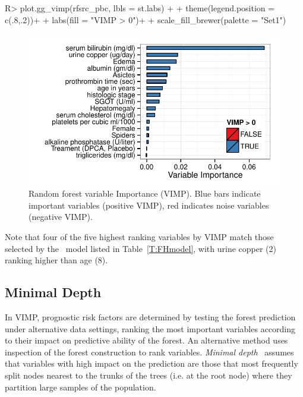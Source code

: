 \documentclass[nojss]{jss}\usepackage[]{graphicx}\usepackage[]{color}
\makeatletter
\def\maxwidth{ %
  \ifdim\Gin@nat@width>\linewidth
    \linewidth
  \else
    \Gin@nat@width
  \fi
}
\makeatother
\begin{document}
\begin{Schunk}
\begin{Sinput}
R> plot.gg_vimp(rfsrc_pbc, lbls = st.labs) + 
+   theme(legend.position = c(.8,.2))+
+   labs(fill = "VIMP > 0")+
+   scale_fill_brewer(palette = "Set1")
\end{Sinput}
\begin{figure}[!htpb]

{\centering \includegraphics[width=\maxwidth]{figure/rfs-rf-vimp-1} 

}

\caption[Random forest variable Importance (VIMP)]{Random forest variable Importance (VIMP). Blue bars indicate important variables (positive VIMP), red indicates noise variables (negative VIMP).\label{fig:rf-vimp}}
\end{figure}
\end{Schunk}

Note that four of the five highest ranking variables by VIMP match those selected by the~\cite{fleming:1991} model listed in Table~\ref{T:FHmodel}, with urine copper (2) ranking higher than age (8).  

\subsection{Minimal Depth}\label{S:minimalDepth}

In VIMP, prognostic risk factors are determined by testing the forest prediction under alternative data settings, ranking the most important variables according to their impact on predictive ability of the forest. An alternative method uses inspection of the forest construction to rank variables. \emph{Minimal depth}~\citep{Ishwaran:2010, Ishwaran:2011} assumes that variables with high impact on the prediction are those that most frequently split nodes nearest to the trunks of the trees (i.e. at the root node) where they partition large samples of the population. 
\end{document}
